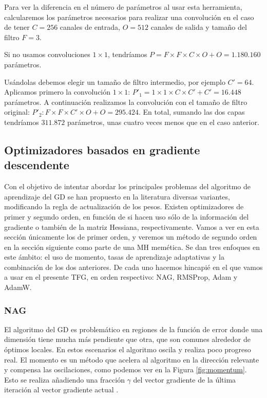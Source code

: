 \begin{ejemplo}
	Para ver la diferencia en el número de parámetros al usar esta herramienta, calcularemos los parámetros necesarios para realizar una convolución en el caso de tener $C=256$ canales de entrada, $O=512$ canales de salida y tamaño del filtro $F=3$.
	
	Si no usamos convoluciones $1 \times 1$, tendríamos $P= F \times F \times C \times O + O = 1.180.160$ parámetros.
	
	Usándolas debemos elegir un tamaño de filtro intermedio, por ejemplo $C'=64$. Aplicamos primero la convolución $1 \times 1$: $P'_1= 1 \times 1 \times C \times C' + C'=16.448$ parámetros. A continuación realizamos la convolución con el tamaño de filtro original: $P'_2: F \times F \times C' \times O + O=295.424$. En total, sumando las dos capas tendríamos $311.872$ parámetros, unas cuatro veces menos que en el caso anterior.
\end{ejemplo}



\subsection{Optimizadores basados en gradiente descendente}
\label{sec:gd}
Con el objetivo de intentar abordar los principales problemas del algoritmo de aprendizaje del GD se han propuesto en la literatura diversas variantes, modificando la regla de actualización de los pesos. Existen optimizadores de primer y segundo orden, en función de si hacen uso sólo de la información del gradiente o también de la matriz Hessiana, respectivamente. Vamos a ver en esta sección únicamente los de primer orden, y veremos un método de segundo orden en la sección siguiente como parte de una MH memética. Se dan tres enfoques en este ámbito: el uso de momento, tasas de aprendizaje adaptativas y la combinación de los dos anteriores. De cada uno hacemos hincapié en el que vamos a usar en el presente TFG, en orden respectivo: NAG, RMSProp, Adam y AdamW.

\subsubsection{NAG}

El algoritmo del GD es problemático en regiones de la función de error donde una dimensión tiene mucha más pendiente que otra, que son comunes alrededor de óptimos locales. En estos escenarios el algoritmo oscila y realiza poco progreso real. El momento \cite{momentumorig} es un método que acelera al algoritmo en la dirección relevante y compensa las oscilaciones, como podemos ver en la Figura \ref{fig:momentum}. Esto se realiza añadiendo una fracción $\gamma$ del vector gradiente de la última iteración al vector gradiente actual \cite{divedeeplearning, GoodFellowBook}.

